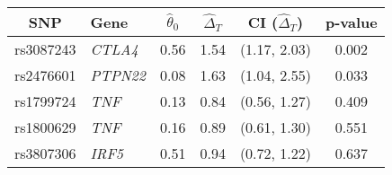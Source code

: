 \begin{tabular}{llcccc} 
\toprule
\multicolumn{1}{c}{SNP} & \multicolumn{1}{l}{Gene} & $\hat \theta_0$ & $\hat \Delta_T$ & CI ($\hat \Delta_T$) & p-value \\ 
\midrule
rs3087243 & \textit{CTLA4}          & 0.56 & 1.54 & (1.17, 2.03) & 0.002 \\
rs2476601 & \textit{PTPN22}         & 0.08 & 1.63 & (1.04, 2.55) & 0.033 \\
rs1799724 & \textit{TNF} & 0.13 & 0.84 & (0.56, 1.27) & 0.409 \\
rs1800629 & \textit{TNF} & 0.16 & 0.89 & (0.61, 1.30) & 0.551 \\
rs3807306 & \textit{IRF5}           & 0.51 & 0.94 & (0.72, 1.22) & 0.637 \\
\bottomrule
\end{tabular}